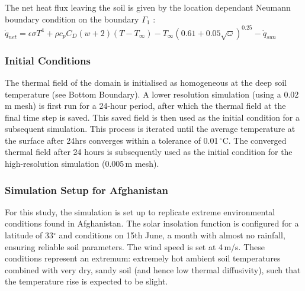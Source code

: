         The net heat flux leaving the soil is given by the location dependant Neumann boundary condition on the boundary $\Gamma_1$ : $\dot{q}_{net} = \epsilon \sigma T^4+ \rho c_p C_D(w+2)(T - T_{\infty}) - T_{\infty} \left( 0.61 + 0.05 \sqrt{\omega} \right)^{0.25}  - \dot{q}_{sun}$
    
    \subsubsection{Initial Conditions}

        The thermal field of the domain is initialised as homogeneous at the deep soil temperature (see Bottom Boundary). A lower resolution simulation (using a 0.02\,m mesh) is first run for a 24-hour period, after which the thermal field at the final time step is saved. This saved field is then used as the initial condition for a subsequent simulation. This process is iterated until the average temperature at the surface after 24hrs converges within a tolerance of 0.01\,\(^\circ\)C. The converged thermal field after 24 hours is subsequently used as the initial condition for the high-resolution simulation (0.005\,m mesh).

    \subsubsection{Simulation Setup for Afghanistan}
    
        For this study, the simulation is set up to replicate extreme environmental conditions found in Afghanistan. The solar insolation function is configured for a latitude of 33\(^\circ\) and conditions on 15th June, a month with almost no rainfall, ensuring reliable soil parameters. The wind speed is set at 4\,m/s. These conditions represent an extremum: extremely hot ambient soil temperatures combined with very dry, sandy soil (and hence low thermal diffusivity), such that the temperature rise is expected to be slight.
    
